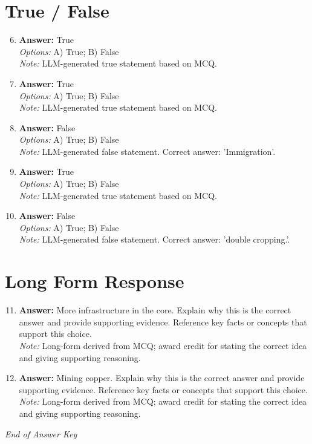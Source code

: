 \documentclass[12pt]{article}
\begin{document}
\section*{True / False}
\begin{enumerate}[label=\arabic*.]
\setcounter{enumi}{5}
\item \textbf{Answer:} True
\\ \textit{Options:} A) True; B) False
\\ \textit{Note:} LLM-generated true statement based on MCQ.
\item \textbf{Answer:} True
\\ \textit{Options:} A) True; B) False
\\ \textit{Note:} LLM-generated true statement based on MCQ.
\item \textbf{Answer:} False
\\ \textit{Options:} A) True; B) False
\\ \textit{Note:} LLM-generated false statement. Correct answer: 'Immigration'.
\item \textbf{Answer:} True
\\ \textit{Options:} A) True; B) False
\\ \textit{Note:} LLM-generated true statement based on MCQ.
\item \textbf{Answer:} False
\\ \textit{Options:} A) True; B) False
\\ \textit{Note:} LLM-generated false statement. Correct answer: 'double cropping.'.
\end{enumerate}

\section*{Long Form Response}
\begin{enumerate}[label=\arabic*.]
\setcounter{enumi}{10}
\item \textbf{Answer:} More infrastructure in the core. Explain why this is the correct answer and provide supporting evidence. Reference key facts or concepts that support this choice.
\\ \textit{Note:} Long-form derived from MCQ; award credit for stating the correct idea and giving supporting reasoning.
\item \textbf{Answer:} Mining copper. Explain why this is the correct answer and provide supporting evidence. Reference key facts or concepts that support this choice.
\\ \textit{Note:} Long-form derived from MCQ; award credit for stating the correct idea and giving supporting reasoning.
\end{enumerate}

\vfill
\noindent\textit{End of Answer Key}
\end{document}
